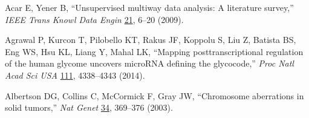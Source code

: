 
Acar E, Yener B, ``Unsupervised multiway data analysis: A literature survey,'' {\em IEEE Trans Knowl Data Engin} \underline{21}, 6--20 (2009).



Agrawal P, Kurcon T, Pilobello KT, Rakus JF, Koppolu S, Liu Z, Batista BS, Eng WS, Hsu KL, Liang Y, Mahal LK, ``Mapping posttranscriptional regulation of the human glycome uncovers microRNA defining the glycocode,'' \emph{Proc Natl Acad Sci USA} \underline{111}, 4338--4343 (2014).



Albertson DG, Collins C, McCormick F, Gray JW, ``Chromosome aberrations in solid tumors,'' \emph{Nat Genet} \underline{34}, 369--376 (2003).
